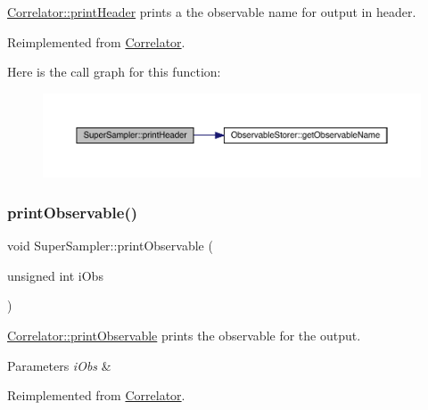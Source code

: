 \mbox{\hyperlink{class_correlator_ac7c5a07d7cbee97c417a1659b93083b2}{Correlator\+::print\+Header}} prints a the observable name for output in header. 



Reimplemented from \mbox{\hyperlink{class_correlator_ac7c5a07d7cbee97c417a1659b93083b2}{Correlator}}.

Here is the call graph for this function\+:
\nopagebreak
\begin{figure}[H]
\begin{center}
\leavevmode
\includegraphics[width=350pt]{class_super_sampler_a9bedfcc40a22c48378a6ed63f64e6957_cgraph}
\end{center}
\end{figure}
\mbox{\label{class_super_sampler_adf92b9281ee9a782e6c00424dd23451d}} 
\subsubsection{\texorpdfstring{printObservable()}{printObservable()}}
{\footnotesize\ttfamily void Super\+Sampler\+::print\+Observable (\begin{DoxyParamCaption}\item[{unsigned int}]{i\+Obs }\end{DoxyParamCaption})\hspace{0.3cm}{\ttfamily [virtual]}}



\mbox{\hyperlink{class_correlator_a15744ddb9f2b71fff34ac762d101df38}{Correlator\+::print\+Observable}} prints the observable for the output. 


\begin{DoxyParams}{Parameters}
{\em i\+Obs} & \\
\hline
\end{DoxyParams}


Reimplemented from \mbox{\hyperlink{class_correlator_a15744ddb9f2b71fff34ac762d101df38}{Correlator}}.

